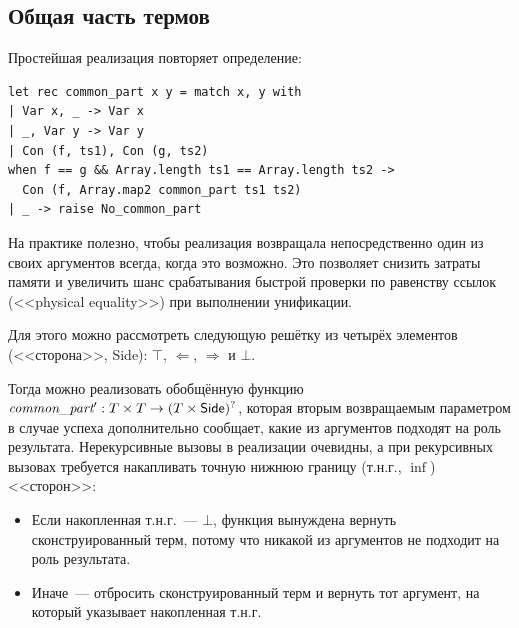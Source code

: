 \subsection{Общая часть термов}

Простейшая реализация \commonpart повторяет определение:
\begin{verbatim}
let rec common_part x y = match x, y with
| Var x, _ -> Var x
| _, Var y -> Var y
| Con (f, ts1), Con (g, ts2)
when f == g && Array.length ts1 == Array.length ts2 ->
  Con (f, Array.map2 common_part ts1 ts2)
| _ -> raise No_common_part
\end{verbatim}

На практике полезно, чтобы реализация \commonpart возвращала непосредственно один из своих аргументов всегда, когда это возможно. Это позволяет снизить затраты памяти и увеличить шанс срабатывания быстрой проверки по равенству ссылок (<<physical equality>>) при выполнении унификации.

Для этого можно рассмотреть следующую решётку из четырёх элементов (<<сторона>>, \textsf{Side}): $\top$, $\Leftarrow$, $\Rightarrow$ и $\bot$.
\begin{center}
\end{center}

Тогда можно реализовать обобщённую функцию $\textit{common\_part}' : T \times T \rightarrow (T \times \textsf{Side})^?$, которая вторым возвращаемым параметром в случае успеха дополнительно сообщает, какие из аргументов подходят на роль результата. Нерекурсивные вызовы в реализации очевидны, а при рекурсивных вызовах требуется накапливать точную нижнюю границу (т.н.г., $\inf$) <<сторон>>:
\begin{itemize}
    \item Если накопленная т.н.г.~--- $\bot$, функция вынуждена вернуть сконструированный терм, потому что никакой из аргументов не подходит на роль результата.
    \item Иначе~--- отбросить сконструированный терм и вернуть тот аргумент, на который указывает накопленная т.н.г.
\end{itemize}

